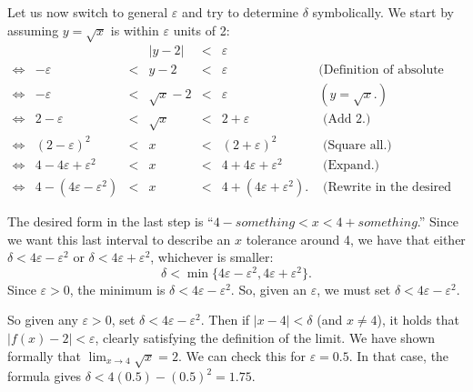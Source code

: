 \begin{example}
Let us now switch to general $\varepsilon$ and try to determine $\delta$ symbolically. \fi 
We start by assuming $y=\sqrt{x}$ is within $\varepsilon$ units of 2:
$$
\begin{array}{rrcccll}
&&&|y - 2| &<& \varepsilon \\
\Leftrightarrow&-\varepsilon &<& y - 2 &<& \varepsilon & \textrm{(Definition of absolute value.)}\\
\Leftrightarrow&-\varepsilon &<& \sqrt{x} - 2 &<& \varepsilon  & (y=\sqrt{x}.)\\
\Leftrightarrow&2 - \varepsilon &<& \sqrt{x}& <& 2+ \varepsilon & \textrm{ (Add 2.)}\\
\Leftrightarrow&(2 - \varepsilon)^2 &<& x &<& (2+ \varepsilon) ^2 &\textrm{ (Square all.)}\\
\Leftrightarrow&4 - 4\varepsilon + \varepsilon^2 &<& x &<& 4 + 4\varepsilon + \varepsilon^2 & \textrm{ (Expand.)}\\
\Leftrightarrow&4 - (4\varepsilon - \varepsilon^2) &<& x &<& 4 + (4\varepsilon + \varepsilon^2). & \textrm{ (Rewrite in the desired form.)}
\end{array}
$$


The desired form in the last step is ``$4-something < x < 4 +something$.''
Since we want this last interval to describe an $x$ tolerance around 4, we have that either $\delta < 4\varepsilon - \varepsilon^2$ or $\delta < 4\varepsilon + \varepsilon^2$, whichever is smaller: $$\delta < \min\{4\varepsilon - \varepsilon^2, 4\varepsilon + \varepsilon^2\}.$$  Since $\varepsilon > 0$, the minimum is $\delta < 4\varepsilon - \varepsilon^2$.  So, given an $\varepsilon$, we must set $\delta < 4\varepsilon-\varepsilon^2$. 



So given any $\varepsilon >0$, set $\delta < 4\varepsilon - \varepsilon^2$. Then if $|x-4|<\delta$ (and $x\neq 4$), it holds that $|f(x) - 2| < \varepsilon$, clearly satisfying the definition of the limit.  We have shown formally that $\displaystyle \lim_{x\rightarrow 4} \sqrt{x} = 2 $. We can check this for $\varepsilon=0.5$. In that case, the formula gives $\delta < 4(0.5) - (0.5)^2 = 1.75$. 
\end{example}




